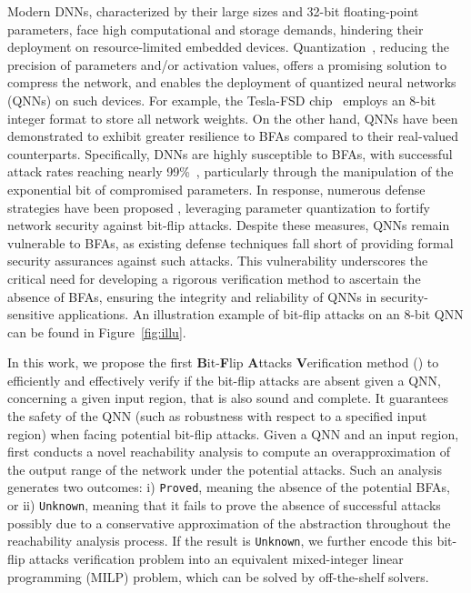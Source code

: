 Modern DNNs, characterized by their large sizes and 32-bit floating-point parameters, face high computational and storage demands, hindering their deployment on resource-limited embedded devices. Quantization~\cite{DSQ,HanMD15,JacobKCZTHAK18}, reducing the precision of parameters and/or activation values, offers a promising solution to compress the network, and enable{s} the deployment of quantized neural networks (QNNs) on such devices. For example, the Tesla-FSD chip~\cite{FSDChip} employs an 8-bit integer format to store all network weights. On the other hand, QNNs have been demonstrated to exhibit greater resilience to BFAs compared to their real-valued counterparts. Specifically, DNNs are highly susceptible to BFAs, with successful attack rates reaching nearly 99\%~\cite{HONG_USENIX19}, particularly through the manipulation of the exponential bit of compromised parameters. In response, numerous defense strategies have been proposed \cite{advwa,HARDeNN,randomDNN}, leveraging parameter quantization to fortify network security against bit-flip attacks. Despite these measures, QNNs remain vulnerable to BFAs, as existing defense techniques fall short of providing formal security assurances against such attacks. This vulnerability underscores the critical need for developing a rigorous verification method to ascertain the absence of BFAs, ensuring the integrity and reliability of QNNs in security-sensitive applications. An illustration example of bit-flip attacks on an 8-bit QNN can be found in Figure~\ref{fig:illu}.


\smallskip
{} 
In this work, we propose the first \textbf{B}it-\textbf{F}lip \textbf{A}ttacks \textbf{V}erification method (\tool) to efficiently and effectively verify if the bit-flip attacks are absent given a QNN, concerning a given input region, that is also sound and complete. It guarantees the safety of the QNN (such as robustness with respect to a specified input region) when facing potential bit-flip attacks. Given a QNN and an input region, \tool first conducts a novel reachability analysis to compute an overapproximation of the output range of the network under the potential attacks. Such an analysis generates two outcomes: i) \texttt{Proved}, meaning the absence of the potential BFAs, or ii) \texttt{Unknown}, meaning that it fails to prove the absence of successful attacks possibly due to a conservative approximation of the abstraction throughout the reachability analysis process. If the result is \texttt{Unknown}, we further encode this bit-flip attacks verification problem into an equivalent mixed-integer linear programming (MILP) problem, which can be solved by off-the-shelf solvers.

